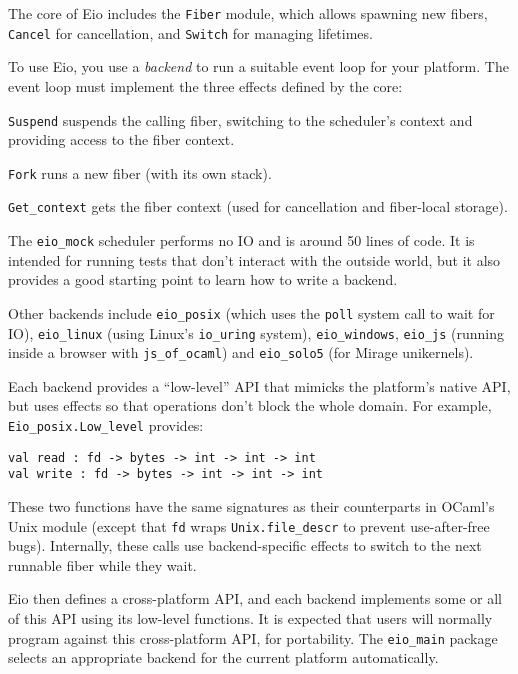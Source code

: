 \documentclass[a4paper,twocolumn]{article}
\begin{document}
The core of Eio includes the \verb|Fiber| module, which allows spawning new fibers,
\verb|Cancel| for cancellation, and \verb|Switch| for managing lifetimes.

To use Eio, you use a \emph{backend} to run a suitable event loop for your platform.
The event loop must implement the three effects defined by the core:

\begin{description}
	\item{\verb|Suspend|} suspends the calling fiber, switching to the scheduler's context and providing access to the fiber context.
	\item{\verb|Fork|} runs a new fiber (with its own stack).
	\item{\verb|Get_context|} gets the fiber context (used for cancellation and fiber-local storage).
\end{description}

The \verb|eio_mock| scheduler performs no IO and is around 50 lines of code.
It is intended for running tests that don't interact with the outside world,
but it also provides a good starting point to learn how to write a backend.

Other backends include \verb|eio_posix| (which uses the \verb|poll| system call to wait for IO),
\verb|eio_linux| (using Linux's \verb|io_uring| system), \verb|eio_windows|,
\verb|eio_js| (running inside a browser with \verb|js_of_ocaml|) and \verb|eio_solo5| (for Mirage unikernels).

Each backend provides a ``low-level'' API that mimicks the platform's native API, but uses effects so that operations don't block the whole domain. For example, \verb|Eio_posix.Low_level| provides:

\begin{lstlisting}[style=ocaml,basicstyle=\small]
val read : fd -> bytes -> int -> int -> int
val write : fd -> bytes -> int -> int -> int
\end{lstlisting}

These two functions have the same signatures as their counterparts in OCaml's Unix module
(except that \verb|fd| wraps \verb|Unix.file_descr| to prevent use-after-free bugs).
Internally, these calls use backend-specific effects to switch to the next runnable fiber while they wait.

Eio then defines a cross-platform API, and each backend implements some or all of this API using its low-level functions.
It is expected that users will normally program against this cross-platform API, for portability.
The \verb|eio_main| package selects an appropriate backend for the current platform automatically.
\end{document}
